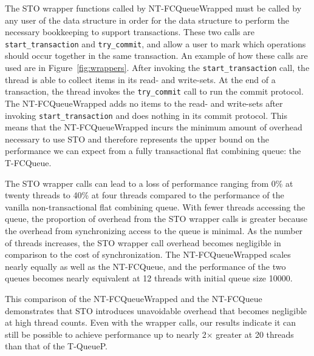 The STO wrapper functions called by NT-FCQueueWrapped must be called by any user of the data structure in order for the data structure to perform the necessary bookkeeping to support transactions.
These two calls are \texttt{start\_transaction} and \texttt{try\_commit}, and allow a user to mark which operations should occur together in the same transaction. An example of how these calls are used are in Figure~\ref{fig:wrappers}. After invoking the \texttt{start\_transaction} call, the thread is able to collect items in its read- and write-sets. At the end of a transaction, the thread invokes the \texttt{try\_commit} call to run the commit protocol. The NT-FCQueueWrapped adds no items to the read- and write-sets after invoking \texttt{start\_transaction} and does nothing in its commit protocol. This means that the NT-FCQueueWrapped incurs the minimum amount of overhead necessary to use STO and therefore represents the upper bound on the performance we can expect from a fully transactional flat combining queue: the T-FCQueue. 

The STO wrapper calls can lead to a loss of performance ranging from 0\% at twenty threads to 40\% at four threads compared to the performance of the vanilla non-transactional flat combining queue. 
 With fewer threads accessing the queue, the proportion of overhead from the STO wrapper calls is greater because the overhead from synchronizing access to the queue is minimal. As the number of threads increases, the STO wrapper call overhead becomes negligible in comparison to the cost of synchronization.
The NT-FCQueueWrapped scales nearly equally as well as the NT-FCQueue, and the performance of the two queues becomes nearly equivalent at 12 threads with initial queue size 10000.


This comparison of the NT-FCQueueWrapped and the NT-FCQueue demonstrates that STO introduces unavoidable overhead that becomes negligible at high thread counts. Even with the wrapper calls, our results indicate it can still be possible to achieve performance up to nearly 2$\times$ greater at 20 threads than that of the T-QueueP.

\vspace{12pt}
\noindent{}

